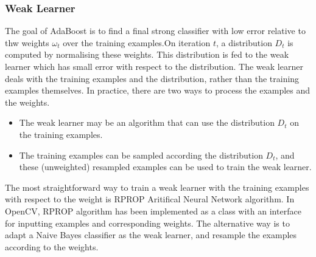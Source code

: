\subsubsection{Weak Learner}
The goal of AdaBoost is to find a final strong classifier with low error relative to thw weights $\omega_{t}$ over the training examples.On iteration $t$, a distribution $D_{t}$ is computed by normalising these weights. This distribution is fed to the weak learner which has small error with respect to the distribution. The weak learner deals with the training examples and the distribution, rather than the training examples themselves. In practice, there are two ways to process the examples and the weights.
\begin{itemize}
 \item The weak learner may be an algorithm that can use the distribution $D_{t}$ on the training examples.
 \item The training examples can be sampled according the distribution $D_{t}$, and these (unweighted) resampled examples can be used to train the weak learner.
\end{itemize}
The most straightforward way to train a weak learner with the training examples with respect to the weight is RPROP\cite{Riedmiller1993} Aritifical Neural Network algorithm. In OpenCV, RPROP algorithm has been implemented as a class with an interface for inputting examples and corresponding weights. The alternative way is to adapt a Naive Bayes classifier as the weak learner, and resample the examples according to the weights.
